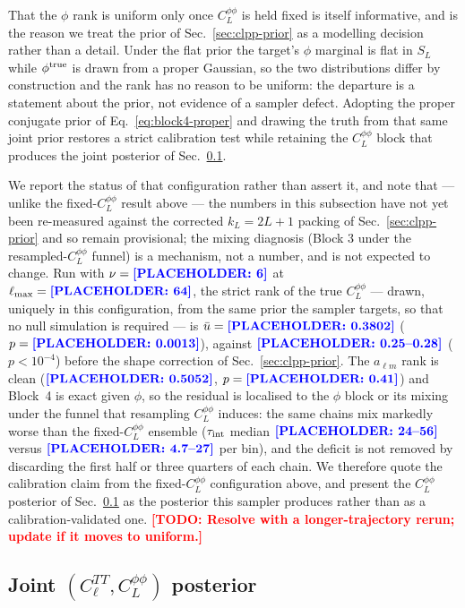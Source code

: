 \documentclass[twocolumn,superscriptaddress,aps,prl,floatfix]{revtex4-2}
\newcommand{\alm}{a_{\ell m}}
\newcommand{\cl}{C_\ell}
\newcommand{\clpp}{C_L^{\phi\phi}}
\newcommand{\lmax}{\ell_{\max}}
\newcommand{\todo}[1]{\textcolor{red}{\textbf{[TODO: #1]}}}
\newcommand{\placeholder}[1]{\textcolor{blue}{\textbf{[PLACEHOLDER: #1]}}}
\begin{document}
That the $\phi$ rank is uniform only once $\clpp$ is held fixed is itself
informative, and is the reason we treat the prior of Sec.~\ref{sec:clpp-prior}
as a modelling decision rather than a detail. Under the flat prior the target's
$\phi$ marginal is flat in $S_L$ while $\phi^{\rm true}$ is drawn from a proper
Gaussian, so the two distributions differ by construction and the rank has no
reason to be uniform: the departure is a statement about the prior, not
evidence of a sampler defect. Adopting the proper conjugate prior of
Eq.~\eqref{eq:block4-proper} and drawing the truth from that same joint prior
restores a strict calibration test while retaining the $\clpp$ block that
produces the joint posterior of Sec.~\ref{sec:joint-posterior}.

We report the status of that configuration rather than assert it, and note
that --- unlike the fixed-$\clpp$ result above --- the numbers in this
subsection have not yet been re-measured against the corrected $k_L=2L+1$
packing of Sec.~\ref{sec:clpp-prior} and so remain provisional; the mixing
diagnosis (Block 3 under the resampled-$\clpp$ funnel) is a mechanism, not a
number, and is not expected to change. Run with
$\nu = \placeholder{6}$ at $\lmax = \placeholder{64}$, the strict rank of
the true $\clpp$ --- drawn, uniquely in this configuration, from the same
prior the sampler targets, so that no null simulation is required --- is
$\bar u = \placeholder{0.3802}$ ($p = \placeholder{0.0013}$), against
$\placeholder{0.25\text{--}0.28}$ ($p < 10^{-4}$) before the shape correction
of Sec.~\ref{sec:clpp-prior}. The $\alm$ rank is clean
($\placeholder{0.5052}$, $p = \placeholder{0.41}$) and Block~4 is exact given
$\phi$, so the residual is localised to the $\phi$ block or its mixing under
the funnel that resampling $\clpp$ induces: the same chains mix markedly worse
than the fixed-$\clpp$ ensemble ($\tau_{\rm int}$ median
$\placeholder{24\text{--}56}$ versus $\placeholder{4.7\text{--}27}$ per bin),
and the deficit is not removed by discarding the first half or three quarters
of each chain. We therefore quote the calibration claim from the fixed-$\clpp$
configuration above, and present the $\clpp$ posterior of
Sec.~\ref{sec:joint-posterior} as the posterior this sampler produces rather
than as a calibration-validated one.
\todo{Resolve with a longer-trajectory rerun; update if it moves to uniform.}

\subsection{Joint $(\cl^{TT}, \clpp)$ posterior}
\label{sec:joint-posterior}
\end{document}
